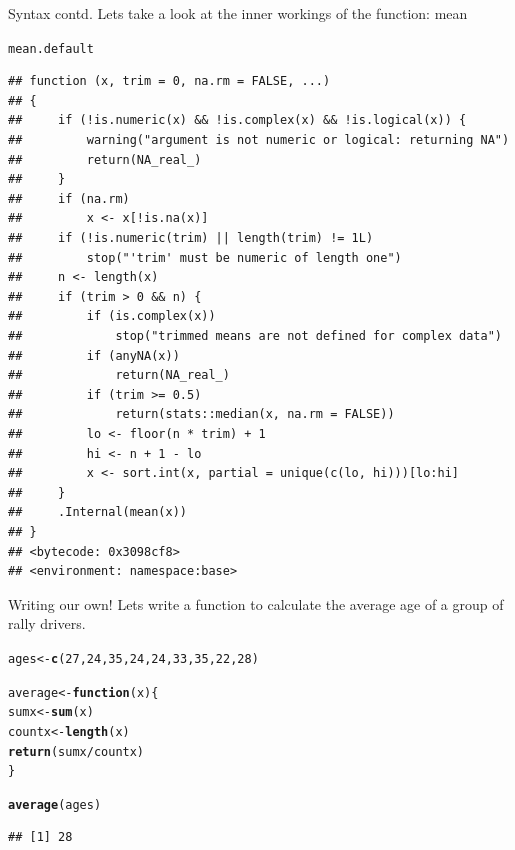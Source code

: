 \documentclass{beamer}\usepackage[]{graphicx}\usepackage[]{color}
\makeatletter
\newcommand{\hlnum}[1]{\textcolor[rgb]{0.686,0.059,0.569}{#1}}%
\newcommand{\hlopt}[1]{\textcolor[rgb]{0,0,0}{#1}}%
\newcommand{\hlstd}[1]{\textcolor[rgb]{0.345,0.345,0.345}{#1}}%
\newcommand{\hlkwa}[1]{\textcolor[rgb]{0.161,0.373,0.58}{\textbf{#1}}}%
\newcommand{\hlkwb}[1]{\textcolor[rgb]{0.69,0.353,0.396}{#1}}%
\newcommand{\hlkwc}[1]{\textcolor[rgb]{0.333,0.667,0.333}{#1}}%
\newcommand{\hlkwd}[1]{\textcolor[rgb]{0.737,0.353,0.396}{\textbf{#1}}}%
\newenvironment{kframe}{%
 \def\at@end@of@kframe{}%
 \ifinner\ifhmode%
  \def\at@end@of@kframe{\end{minipage}}%
  \begin{minipage}{\columnwidth}%
 \fi\fi%
 \def\FrameCommand##1{\hskip\@totalleftmargin \hskip-\fboxsep
 \colorbox{shadecolor}{##1}\hskip-\fboxsep
     \hskip-\linewidth \hskip-\@totalleftmargin \hskip\columnwidth}%
 \MakeFramed {\advance\hsize-\width
   \@totalleftmargin\z@ \linewidth\hsize
   \@setminipage}}%
 {\par\unskip\endMakeFramed%
 \at@end@of@kframe}
\newenvironment{knitrout}{}{} %
\makeatother
\begin{document}
\begin{frame}[fragile]{Syntax contd.}
Lets take a look at the inner workings of the function: mean
\begin{knitrout}
\color{fgcolor}\begin{kframe}
\begin{alltt}
\hlstd{mean.default}
\end{alltt}
\begin{verbatim}
## function (x, trim = 0, na.rm = FALSE, ...) 
## {
##     if (!is.numeric(x) && !is.complex(x) && !is.logical(x)) {
##         warning("argument is not numeric or logical: returning NA")
##         return(NA_real_)
##     }
##     if (na.rm) 
##         x <- x[!is.na(x)]
##     if (!is.numeric(trim) || length(trim) != 1L) 
##         stop("'trim' must be numeric of length one")
##     n <- length(x)
##     if (trim > 0 && n) {
##         if (is.complex(x)) 
##             stop("trimmed means are not defined for complex data")
##         if (anyNA(x)) 
##             return(NA_real_)
##         if (trim >= 0.5) 
##             return(stats::median(x, na.rm = FALSE))
##         lo <- floor(n * trim) + 1
##         hi <- n + 1 - lo
##         x <- sort.int(x, partial = unique(c(lo, hi)))[lo:hi]
##     }
##     .Internal(mean(x))
## }
## <bytecode: 0x3098cf8>
## <environment: namespace:base>
\end{verbatim}
\end{kframe}
\end{knitrout}

\end{frame}

\begin{frame}[fragile]{Writing our own!}
Lets write a function to calculate the average age of a group of rally drivers.
\begin{knitrout}
\color{fgcolor}\begin{kframe}
\begin{alltt}
\hlstd{ages} \hlkwb{<-} \hlkwd{c}\hlstd{(}\hlnum{27}\hlstd{,} \hlnum{24}\hlstd{,} \hlnum{35}\hlstd{,} \hlnum{24}\hlstd{,} \hlnum{24}\hlstd{,} \hlnum{33}\hlstd{,} \hlnum{35}\hlstd{,} \hlnum{22}\hlstd{,} \hlnum{28}\hlstd{)}

\hlstd{average} \hlkwb{<-} \hlkwa{function}\hlstd{(}\hlkwc{x}\hlstd{) \{}
    \hlstd{sumx} \hlkwb{<-} \hlkwd{sum}\hlstd{(x)}
    \hlstd{countx} \hlkwb{<-} \hlkwd{length}\hlstd{(x)}
    \hlkwd{return}\hlstd{(sumx}\hlopt{/}\hlstd{countx)}
\hlstd{\}}

\hlkwd{average}\hlstd{(ages)}
\end{alltt}
\begin{verbatim}
## [1] 28
\end{verbatim}
\end{kframe}
\end{knitrout}

\end{frame}
\end{document}

